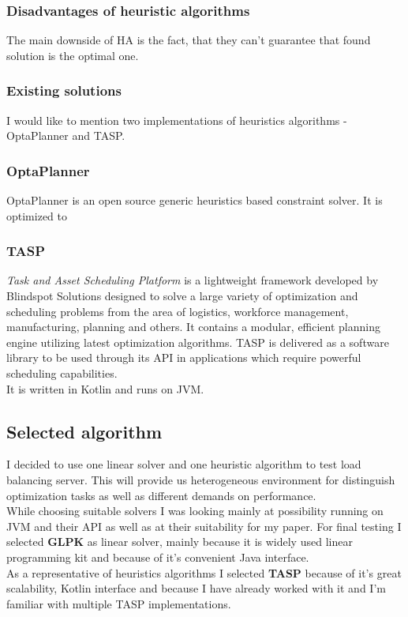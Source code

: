 \subsubsection{Disadvantages of heuristic algorithms}
The main downside of HA is the fact, that they can't guarantee that found solution is the optimal one.

\subsubsection{Existing solutions}\label{subsec:existing-solutions-heur}
I would like to mention two implementations of heuristics algorithms - OptaPlanner and TASP.

\subsubsection{OptaPlanner}
OptaPlanner is an open source generic heuristics based constraint solver.
It is optimized to

\subsubsection{TASP}
\textit{Task and Asset Scheduling Platform}  is a lightweight framework developed by Blindspot Solutions designed to solve a large
variety of optimization and scheduling problems from the area of logistics, workforce management, manufacturing, planning and others.
It contains a modular, efficient planning engine utilizing latest optimization algorithms.
TASP is delivered as a software library to be used through its API in applications which require powerful scheduling capabilities.\\
It is written in Kotlin and runs on JVM.

\subsection{Selected algorithm}\label{subsec:selected-algorithm}
I decided to use one linear solver and one heuristic algorithm to test load balancing server.
This will provide us heterogeneous environment for distinguish optimization tasks as well as different demands on performance.\\
While choosing suitable solvers I was looking mainly at possibility running on JVM and their API as well as at their suitability for my paper.
For final testing I selected \textbf{GLPK} as linear solver, mainly because it is widely used linear programming kit
and because of it's convenient Java interface.\\
As a representative of heuristics algorithms I selected \textbf{TASP} because of it's great scalability, Kotlin interface
and because I have already worked with it and I'm familiar with multiple TASP implementations.
